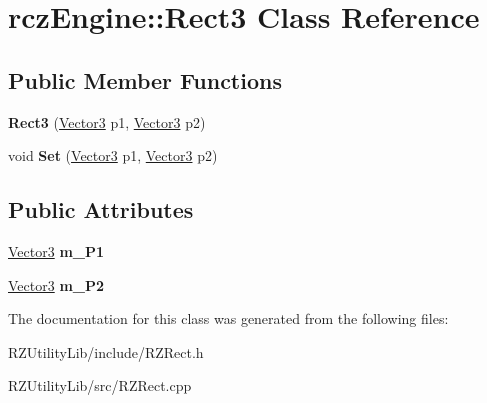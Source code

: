 \hypertarget{classrcz_engine_1_1_rect3}{}\section{rcz\+Engine\+:\+:Rect3 Class Reference}
\label{classrcz_engine_1_1_rect3}
\subsection*{Public Member Functions}
\begin{DoxyCompactItemize}
\item 
\hypertarget{classrcz_engine_1_1_rect3_ac5bd0070b15fe5bbafa0399ed601e1ca}{}{\bfseries Rect3} (\hyperlink{classrcz_engine_1_1_vector3}{Vector3} p1, \hyperlink{classrcz_engine_1_1_vector3}{Vector3} p2)\label{classrcz_engine_1_1_rect3_ac5bd0070b15fe5bbafa0399ed601e1ca}

\item 
\hypertarget{classrcz_engine_1_1_rect3_ab4e17eb11179d497b90389799b5ab62c}{}void {\bfseries Set} (\hyperlink{classrcz_engine_1_1_vector3}{Vector3} p1, \hyperlink{classrcz_engine_1_1_vector3}{Vector3} p2)\label{classrcz_engine_1_1_rect3_ab4e17eb11179d497b90389799b5ab62c}

\end{DoxyCompactItemize}
\subsection*{Public Attributes}
\begin{DoxyCompactItemize}
\item 
\hypertarget{classrcz_engine_1_1_rect3_ab69b6d6eedd308316fc190ed9f3ca4db}{}\hyperlink{classrcz_engine_1_1_vector3}{Vector3} {\bfseries m\+\_\+\+P1}\label{classrcz_engine_1_1_rect3_ab69b6d6eedd308316fc190ed9f3ca4db}

\item 
\hypertarget{classrcz_engine_1_1_rect3_ab2c6b681f12ee6b946473f336ce134c7}{}\hyperlink{classrcz_engine_1_1_vector3}{Vector3} {\bfseries m\+\_\+\+P2}\label{classrcz_engine_1_1_rect3_ab2c6b681f12ee6b946473f336ce134c7}

\end{DoxyCompactItemize}


The documentation for this class was generated from the following files\+:\begin{DoxyCompactItemize}
\item 
R\+Z\+Utility\+Lib/include/R\+Z\+Rect.\+h\item 
R\+Z\+Utility\+Lib/src/R\+Z\+Rect.\+cpp\end{DoxyCompactItemize}
